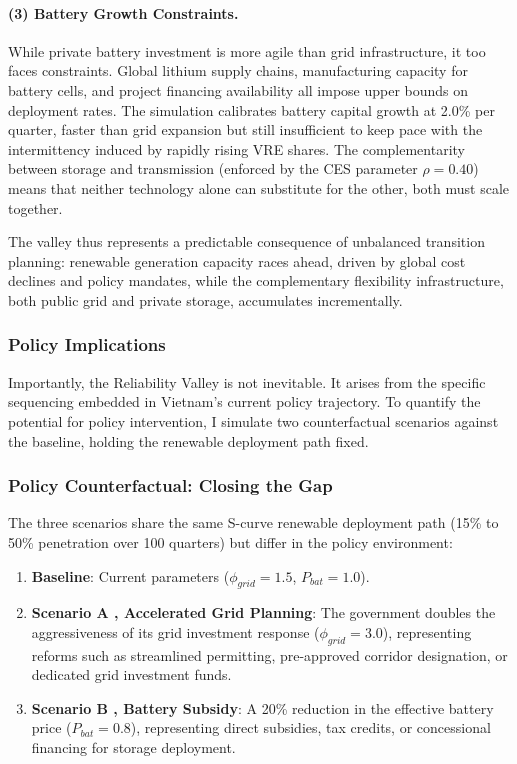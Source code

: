 \documentclass[12pt, a4paper]{article}
\begin{document}
	\paragraph{(3) Battery Growth Constraints.} While private battery investment is more agile than grid infrastructure, it too faces constraints. Global lithium supply chains, manufacturing capacity for battery cells, and project financing availability all impose upper bounds on deployment rates. The simulation calibrates battery capital growth at 2.0\% per quarter, faster than grid expansion but still insufficient to keep pace with the intermittency induced by rapidly rising VRE shares. The complementarity between storage and transmission (enforced by the CES parameter $\rho = 0.40$) means that neither technology alone can substitute for the other, both must scale together.
	
	The valley thus represents a predictable consequence of unbalanced transition planning: renewable generation capacity races ahead, driven by global cost declines and policy mandates, while the complementary flexibility infrastructure, both public grid and private storage, accumulates incrementally.
	
	\subsubsection{Policy Implications}
	
	Importantly, the Reliability Valley is not inevitable. It arises from the specific sequencing embedded in Vietnam's current policy trajectory. To quantify the potential for policy intervention, I simulate two counterfactual scenarios against the baseline, holding the renewable deployment path fixed.
	
	\subsubsection{Policy Counterfactual: Closing the Gap}
	
	The three scenarios share the same S-curve renewable deployment path (15\% to 50\% penetration over 100 quarters) but differ in the policy environment:
	
	\begin{enumerate}
		\item \textbf{Baseline}: Current parameters ($\phi_{grid} = 1.5$, $P_{bat} = 1.0$).
		\item \textbf{Scenario A ,  Accelerated Grid Planning}: The government doubles the aggressiveness of its grid investment response ($\phi_{grid} = 3.0$), representing reforms such as streamlined permitting, pre-approved corridor designation, or dedicated grid investment funds.
		\item \textbf{Scenario B ,  Battery Subsidy}: A 20\% reduction in the effective battery price ($P_{bat} = 0.8$), representing direct subsidies, tax credits, or concessional financing for storage deployment.
	\end{enumerate}
	
\end{document}
